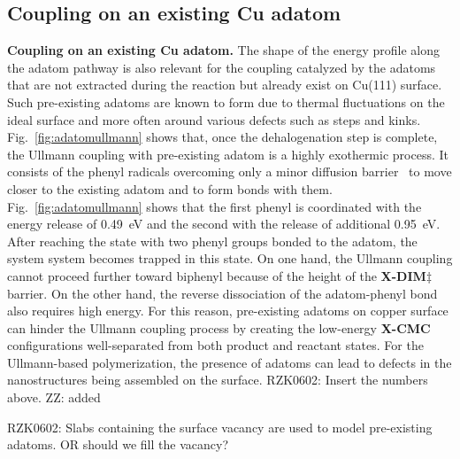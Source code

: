 \documentclass[%
 reprint,
 amsmath,amssymb,
 aps,
prb,
floatfix,
]{revtex4-2}
\newcommand{\lock}{\color{red}}
\newcommand{\zhzh}{\color{blue}}
\newcommand{\lock}{\color{black}}
\newcommand{\zhzh}{\color{blue}}
\newcommand{\comm}{\color{ForestGreen}} %
\begin{document}

\ifdefined\INTERNAL
\subsection{Coupling on an existing Cu adatom}
\fi

{\lock

\textbf{Coupling on an existing Cu adatom.} The shape of the energy profile along the adatom pathway is also relevant for the coupling catalyzed by the adatoms that are not extracted during the reaction but already exist on Cu(111) surface. Such pre-existing adatoms are known to form due to thermal fluctuations on the ideal surface and more often around various defects such as steps and kinks. Fig.~\ref{fig:adatomullmann} shows that, once the dehalogenation step is complete, the Ullmann coupling with pre-existing adatom is a highly exothermic process. It consists of the phenyl radicals overcoming only a minor diffusion barrier~\cite{pccp2010} to move closer to the existing adatom and to form bonds with them. Fig.~\ref{fig:adatomullmann} shows that the first phenyl is coordinated with the energy release of \SI{0.49}{\electronvolt} and the second with the release of additional \SI{0.95}{\electronvolt}. After reaching the state with two phenyl groups bonded to the adatom, the system system becomes trapped in this state. On one hand, the Ullmann coupling cannot proceed further toward biphenyl because of the height of the \textbf{X-DIM$\ddagger$} barrier. On the other hand, the reverse dissociation of the adatom-phenyl bond also requires high energy. For this reason, pre-existing adatoms on copper surface can hinder the Ullmann coupling process by creating the low-energy \textbf{X-CMC} configurations well-separated from both product and reactant states. For the Ullmann-based polymerization, the presence of adatoms can lead to defects in the nanostructures being assembled on the surface.
{\comm RZK0602: Insert the numbers above.} {\zhzh ZZ: added}

{\comm RZK0602: Slabs containing the surface vacancy are used to model pre-existing adatoms. OR should we fill the vacancy?}

}
\end{document}
